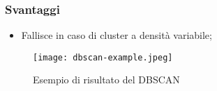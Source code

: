         \subsubsection{Svantaggi}
            \begin{itemize}
                \item Fallisce in caso di cluster a densità variabile;
            \end{itemize}

        \begin{figure}[h]
            \caption{Esempio di risultato del DBSCAN}
            \centering
            \texttt{[image: dbscan-example.jpeg]}
        \end{figure}

\clearpage
